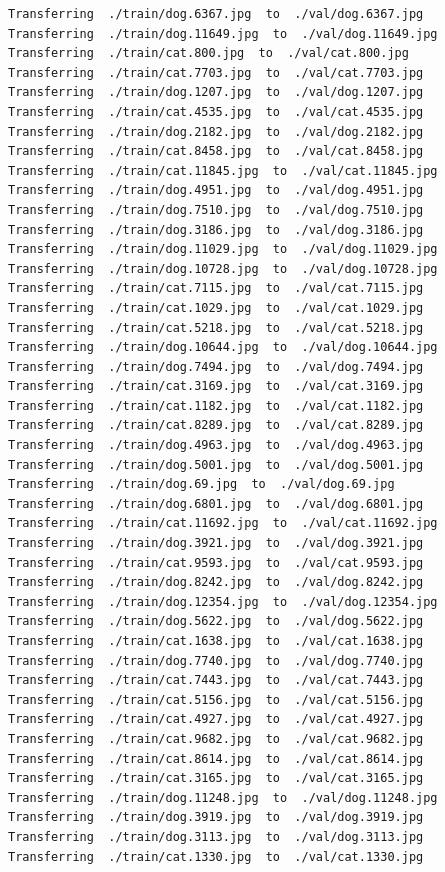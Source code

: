 \documentclass[]{book}
\theoremstyle{definition}
\theoremstyle{definition}
\theoremstyle{definition}
\theoremstyle{remark}
\begin{document}
\begin{verbatim}
Transferring  ./train/dog.6367.jpg  to  ./val/dog.6367.jpg
Transferring  ./train/dog.11649.jpg  to  ./val/dog.11649.jpg
Transferring  ./train/cat.800.jpg  to  ./val/cat.800.jpg
Transferring  ./train/cat.7703.jpg  to  ./val/cat.7703.jpg
Transferring  ./train/dog.1207.jpg  to  ./val/dog.1207.jpg
Transferring  ./train/cat.4535.jpg  to  ./val/cat.4535.jpg
Transferring  ./train/dog.2182.jpg  to  ./val/dog.2182.jpg
Transferring  ./train/cat.8458.jpg  to  ./val/cat.8458.jpg
Transferring  ./train/cat.11845.jpg  to  ./val/cat.11845.jpg
Transferring  ./train/dog.4951.jpg  to  ./val/dog.4951.jpg
Transferring  ./train/dog.7510.jpg  to  ./val/dog.7510.jpg
Transferring  ./train/dog.3186.jpg  to  ./val/dog.3186.jpg
Transferring  ./train/dog.11029.jpg  to  ./val/dog.11029.jpg
Transferring  ./train/dog.10728.jpg  to  ./val/dog.10728.jpg
Transferring  ./train/cat.7115.jpg  to  ./val/cat.7115.jpg
Transferring  ./train/cat.1029.jpg  to  ./val/cat.1029.jpg
Transferring  ./train/cat.5218.jpg  to  ./val/cat.5218.jpg
Transferring  ./train/dog.10644.jpg  to  ./val/dog.10644.jpg
Transferring  ./train/dog.7494.jpg  to  ./val/dog.7494.jpg
Transferring  ./train/cat.3169.jpg  to  ./val/cat.3169.jpg
Transferring  ./train/cat.1182.jpg  to  ./val/cat.1182.jpg
Transferring  ./train/cat.8289.jpg  to  ./val/cat.8289.jpg
Transferring  ./train/dog.4963.jpg  to  ./val/dog.4963.jpg
Transferring  ./train/dog.5001.jpg  to  ./val/dog.5001.jpg
Transferring  ./train/dog.69.jpg  to  ./val/dog.69.jpg
Transferring  ./train/dog.6801.jpg  to  ./val/dog.6801.jpg
Transferring  ./train/cat.11692.jpg  to  ./val/cat.11692.jpg
Transferring  ./train/dog.3921.jpg  to  ./val/dog.3921.jpg
Transferring  ./train/cat.9593.jpg  to  ./val/cat.9593.jpg
Transferring  ./train/dog.8242.jpg  to  ./val/dog.8242.jpg
Transferring  ./train/dog.12354.jpg  to  ./val/dog.12354.jpg
Transferring  ./train/dog.5622.jpg  to  ./val/dog.5622.jpg
Transferring  ./train/cat.1638.jpg  to  ./val/cat.1638.jpg
Transferring  ./train/dog.7740.jpg  to  ./val/dog.7740.jpg
Transferring  ./train/cat.7443.jpg  to  ./val/cat.7443.jpg
Transferring  ./train/cat.5156.jpg  to  ./val/cat.5156.jpg
Transferring  ./train/cat.4927.jpg  to  ./val/cat.4927.jpg
Transferring  ./train/cat.9682.jpg  to  ./val/cat.9682.jpg
Transferring  ./train/cat.8614.jpg  to  ./val/cat.8614.jpg
Transferring  ./train/cat.3165.jpg  to  ./val/cat.3165.jpg
Transferring  ./train/dog.11248.jpg  to  ./val/dog.11248.jpg
Transferring  ./train/dog.3919.jpg  to  ./val/dog.3919.jpg
Transferring  ./train/dog.3113.jpg  to  ./val/dog.3113.jpg
Transferring  ./train/cat.1330.jpg  to  ./val/cat.1330.jpg

\end{verbatim}
\end{document}
